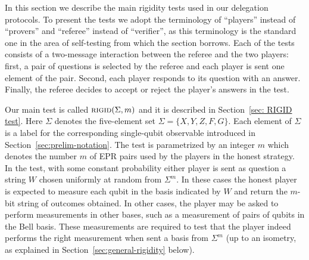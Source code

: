 In this section we describe the main rigidity tests used in our delegation protocols. To present the tests we adopt the terminology of ``players'' instead of ``provers'' and ``referee'' instead of ``verifier'', as this terminology is the standard one in the area of self-testing from which the section borrows. Each of the tests consists of a two-message interaction between the referee and the two players: first, a pair of questions is selected by the referee and each player is sent one element of the pair. Second, each player responds to its question with an answer. Finally, the referee decides to accept or reject the player's answers in the test. 

Our main test is called $\textsc{rigid}(\Sigma,m)$ and it is described in Section~\ref{sec: RIGID test}. Here $\Sigma$ denotes the five-element set $\Sigma = \{X,Y,Z,F,G\}$. Each element of $\Sigma$ is a label for the corresponding single-qubit observable introduced in Section~\ref{sec:prelim-notation}. The test is parametrized by an integer $m$ which denotes the number $m$ of EPR pairs used by the players in the honest strategy. In the test, with some constant probability either player is sent as question a string $W$ chosen uniformly at random from $\Sigma^m$. In these cases the honest player is expected to measure each qubit in the basis indicated by $W$ and return the $m$-bit string of outcomes obtained. In other cases, the player may be asked to perform measurements in other bases, such as a measurement of pairs of qubits in the Bell basis. These measurements are required to test that the player indeed performs the right measurement when sent a basis from $\Sigma^m$ (up to an isometry, as explained in Section~\ref{sec:general-rigidity} below). 

